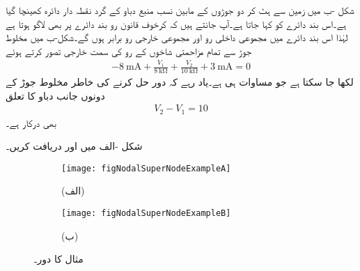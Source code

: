 شکل  -ب میں زمین سے ہٹ کر دو جوڑوں کے مابین نسب منبع دباو کے گرد نقطہ دار دائرہ کھینچا گیا ہے۔اس بند دائرے کو  کہا جاتا ہے۔آپ جانتے ہیں کہ کرخوف قانون رو بند دائرے پر بھی لاگو ہوتا ہے لہٰذا اس بند دائرے میں مجموعی داخلی رو اور مجموعی خارجی رو برابر ہوں گے۔شکل-ب میں مخلوط جوڑ سے تمام مزاحمتی شاخوں کے رو کی سمت خارجی تصور کرتے ہوئے
\begin{align}
-\SI{8}{\milli\ampere}+\frac{V_1}{\SI{8}{\kilo\ohm}}+\frac{V_2}{\SI{10}{\kilo\ohm}}+\SI{3}{\milli\ampere}=0
\end{align}
لکھا جا سکتا ہے جو مساوات   ہی ہے۔یاد رہے کہ دور حل کرنے کی خاطر مخلوط جوڑ کے دونوں جانب دباو کا تعلق
\begin{align}
V_2-V_1=10
\end{align}
بھی درکار ہے۔

شکل -الف میں  اور  دریافت کریں۔
\begin{figure}
\centering
\begin{subfigure}{1\textwidth}
\centering
\texttt{[image: figNodalSuperNodeExampleA]}
\caption*{(الف)}
\end{subfigure}
\begin{subfigure}{1\textwidth}
\centering
\texttt{[image: figNodalSuperNodeExampleB]}
\caption*{(ب)}
\end{subfigure}
\caption{مثال  کا دور۔}
\label{شکل_جوڑ_مثال_مخلوط_جوڑ_ب}
\end{figure}

